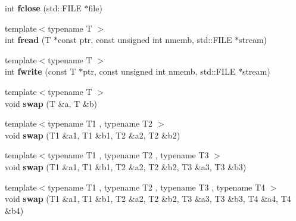 \begin{DoxyCompactItemize}
\item 
\hypertarget{namespacecimg__library_1_1cimg_ae54f76e8c2bcff93277e9cae1906a3d6}{
int {\bfseries fclose} (std::FILE $\ast$file)}
\label{namespacecimg__library_1_1cimg_ae54f76e8c2bcff93277e9cae1906a3d6}

\item 
\hypertarget{namespacecimg__library_1_1cimg_acff6f67e3db01f50704f81d44d43853d}{
{\footnotesize template$<$typename T $>$ }\\int {\bfseries fread} (T $\ast$const ptr, const unsigned int nmemb, std::FILE $\ast$stream)}
\label{namespacecimg__library_1_1cimg_acff6f67e3db01f50704f81d44d43853d}

\item 
\hypertarget{namespacecimg__library_1_1cimg_acfd152b250d25cd25b1622537b23c9b7}{
{\footnotesize template$<$typename T $>$ }\\int {\bfseries fwrite} (const T $\ast$ptr, const unsigned int nmemb, std::FILE $\ast$stream)}
\label{namespacecimg__library_1_1cimg_acfd152b250d25cd25b1622537b23c9b7}

\item 
\hypertarget{namespacecimg__library_1_1cimg_a998ee77cc062d63b4faa62eb659e6e9a}{
{\footnotesize template$<$typename T $>$ }\\void {\bfseries swap} (T \&a, T \&b)}
\label{namespacecimg__library_1_1cimg_a998ee77cc062d63b4faa62eb659e6e9a}

\item 
\hypertarget{namespacecimg__library_1_1cimg_a2b733fa20def6d955d5f3b1a742b2a0e}{
{\footnotesize template$<$typename T1 , typename T2 $>$ }\\void {\bfseries swap} (T1 \&a1, T1 \&b1, T2 \&a2, T2 \&b2)}
\label{namespacecimg__library_1_1cimg_a2b733fa20def6d955d5f3b1a742b2a0e}

\item 
\hypertarget{namespacecimg__library_1_1cimg_a4954a1551001dc082044597dc9fdcbc3}{
{\footnotesize template$<$typename T1 , typename T2 , typename T3 $>$ }\\void {\bfseries swap} (T1 \&a1, T1 \&b1, T2 \&a2, T2 \&b2, T3 \&a3, T3 \&b3)}
\label{namespacecimg__library_1_1cimg_a4954a1551001dc082044597dc9fdcbc3}

\item 
\hypertarget{namespacecimg__library_1_1cimg_a1e3369e3c4141ff696432f35ec075379}{
{\footnotesize template$<$typename T1 , typename T2 , typename T3 , typename T4 $>$ }\\void {\bfseries swap} (T1 \&a1, T1 \&b1, T2 \&a2, T2 \&b2, T3 \&a3, T3 \&b3, T4 \&a4, T4 \&b4)}
\label{namespacecimg__library_1_1cimg_a1e3369e3c4141ff696432f35ec075379}


\end{DoxyCompactItemize}
